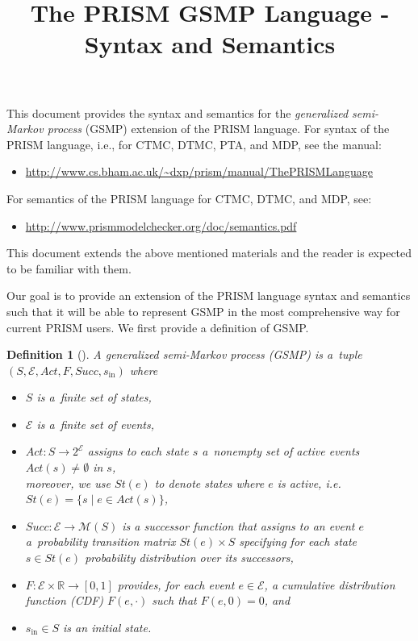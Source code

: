 \documentclass{article}
\title{The PRISM GSMP Language - Syntax and Semantics}
\newtheorem*{definition*}{Definition}
\newcommand{\Rset}{\mathbb{R}}
\newcommand{\calM}{\mathcal{M}}
\newcommand{\calG}{\mathcal{G}}
\newcommand{\calE}{\mathcal{E}}
\renewcommand{\_}{\underline{~}}
\newcommand{\events}{{\calE}}
\newcommand{\suc}{Succ}
\newcommand{\initstate}{s_\mathrm{in}}
\newcommand{\act}{Act}
\newcommand{\transmats}{\calM}
\begin{document}
\maketitle

\noindent
This document provides the syntax and semantics for the \emph{generalized semi-Markov process} (GSMP) extension of the PRISM language.
For syntax of the PRISM language, i.e., for CTMC, DTMC, PTA, and MDP, see the manual:
\begin{itemize}
	\item \url{http://www.cs.bham.ac.uk/~dxp/prism/manual/ThePRISMLanguage}
\end{itemize}
For semantics of the PRISM language for CTMC, DTMC, and MDP, see:
\begin{itemize}
	\item \url{http://www.prismmodelchecker.org/doc/semantics.pdf}
\end{itemize}
This document extends the above mentioned materials and the reader is expected to be familiar with them.

Our goal is to provide an extension of the PRISM language syntax and semantics such that it will be able to represent GSMP in the most comprehensive way for current PRISM users. 
We first provide a definition of GSMP.
\begin{definition*}[\cite{Haas:book}] 
	A generalized semi-Markov process (GSMP) is a~tuple $%
	(S,\events,\act,F,\suc,\initstate)$ where
	\begin{itemize}
		\item $S$ is a~finite set of states,
		\item $\events$ is a~finite set of \emph{events},
		\item $\act \colon S \to 2^{\events}$ assigns to each state $s$ a~nonempty set of active events $\act(s) \not = \emptyset$ in $s$,\\ moreover, we use $St(e)$ to denote states where $e$ is active, i.e. $St(e)=\{s \mid e \in \act(s)\}$,
		\item $\suc : \events \to \transmats(S)$ is a \emph{successor function} that assigns to an event $e$ a~probability transition matrix $St(e)\times S$ 
		specifying for each state $s\in St(e)$ probability distribution over its successors,	
		\item $F\colon \events \times \Rset \to [0,1]$ provides, for each event $e \in \events$, a cumulative distribution function (CDF) $F(e,\cdot)$ such that $F(e,0)=0$, and 
		\item $\initstate \in S$ is an \emph{initial state}.
	\end{itemize}
\end{definition*}
\end{document}

